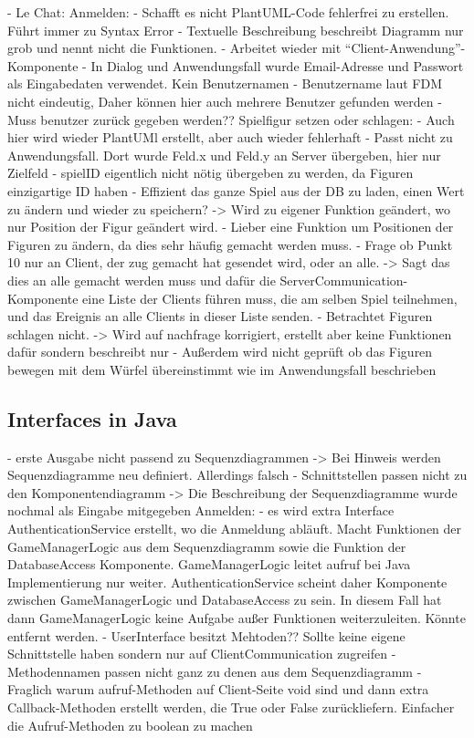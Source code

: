 - Le Chat:
    Anmelden:
        - Schafft es nicht PlantUML-Code fehlerfrei zu erstellen. Führt immer zu Syntax Error
        - Textuelle Beschreibung beschreibt Diagramm nur grob und nennt nicht die Funktionen. 
        - Arbeitet wieder mit ``Client-Anwendung''-Komponente
        - In Dialog und Anwendungsfall wurde Email-Adresse und Passwort als Eingabedaten verwendet. Kein Benutzernamen
        - Benutzername laut FDM nicht eindeutig, Daher können hier auch mehrere Benutzer gefunden werden
        - Muss benutzer zurück gegeben werden??
    Spielfigur setzen oder schlagen:
        - Auch hier wird wieder PlantUMl erstellt, aber auch wieder fehlerhaft
        - Passt nicht zu Anwendungsfall. Dort wurde Feld.x und Feld.y an Server übergeben, hier nur Zielfeld
        - spielID eigentlich nicht nötig übergeben zu werden, da Figuren einzigartige ID haben
        - Effizient das ganze Spiel aus der DB zu laden, einen Wert zu ändern und wieder zu speichern? -> Wird zu eigener Funktion geändert, wo
        nur Position der Figur geändert wird.
        - Lieber eine Funktion um Positionen der Figuren zu ändern, da dies sehr häufig gemacht werden muss.
        - Frage ob Punkt 10 nur an Client, der zug gemacht hat gesendet wird, oder an alle. -> Sagt das dies 
        an alle gemacht werden muss und dafür die ServerCommunication-Komponente eine Liste der Clients führen muss, 
        die am selben Spiel teilnehmen, und das Ereignis an alle Clients in dieser Liste senden.
        - Betrachtet Figuren schlagen nicht. -> Wird auf nachfrage korrigiert, erstellt aber keine Funktionen dafür sondern beschreibt nur
        - Außerdem wird nicht geprüft ob das Figuren bewegen mit dem Würfel übereinstimmt wie im Anwendungsfall beschrieben


\subsection*{Interfaces in Java}

- erste Ausgabe nicht passend zu Sequenzdiagrammen -> Bei Hinweis werden Sequenzdiagramme neu definiert. Allerdings falsch
- Schnittstellen passen nicht zu den Komponentendiagramm
-> Die Beschreibung der Sequenzdiagramme wurde nochmal als Eingabe mitgegeben
Anmelden:
- es wird extra Interface AuthenticationService erstellt, wo die Anmeldung abläuft. Macht Funktionen der GameManagerLogic aus dem Sequenzdiagramm sowie die Funktion der 
DatabaseAccess Komponente. GameManagerLogic leitet aufruf bei Java Implementierung nur weiter. AuthenticationService scheint daher Komponente zwischen GameManagerLogic 
und DatabaseAccess zu sein. In diesem Fall hat dann GameManagerLogic keine Aufgabe außer Funktionen weiterzuleiten. Könnte entfernt werden.
- UserInterface besitzt Mehtoden?? Sollte keine eigene Schnittstelle haben sondern nur auf ClientCommunication zugreifen
- Methodennamen passen nicht ganz zu denen aus dem Sequenzdiagramm
- Fraglich warum aufruf-Methoden auf Client-Seite void sind und dann extra Callback-Methoden erstellt werden, die True oder False zurückliefern. 
Einfacher die Aufruf-Methoden zu boolean zu machen

